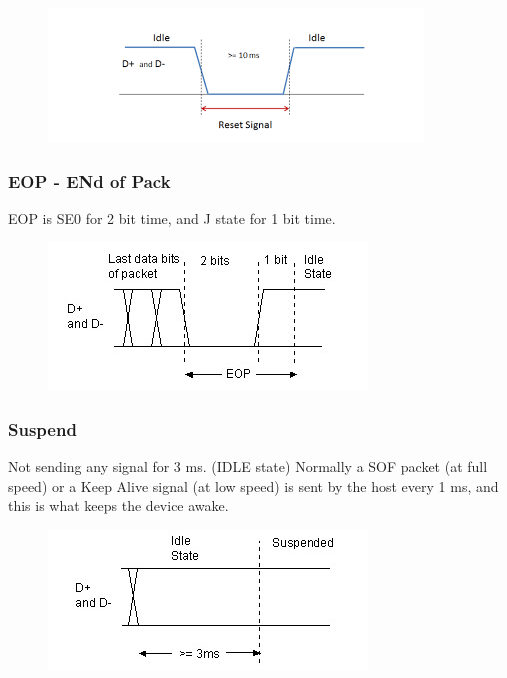\documentclass{article}
\begin{document}
\begin{figure}[H]
    \begin{center}
        \includegraphics[scale=0.5]{DocuResources/resetSingal.png}
    \end{center}
\end{figure}

\subsubsection{EOP - ENd of Pack}
EOP is SE0 for 2 bit time, and J state for 1 bit time.
\begin{figure}[H]
    \begin{center}
        \includegraphics[scale=0.5]{DocuResources/EOPSignal.jpg}
    \end{center}
\end{figure}

\subsubsection{Suspend}
Not sending any signal for 3 ms. (IDLE state)
Normally a SOF packet (at full speed) or a Keep Alive signal (at low speed) is sent by the host every 1 ms, and this is what keeps the device awake.
\begin{figure}[H]
    \begin{center}
        \includegraphics[scale=0.5]{DocuResources/SuspendSIgnal.jpg}
    \end{center}
\end{figure}
\end{document}
